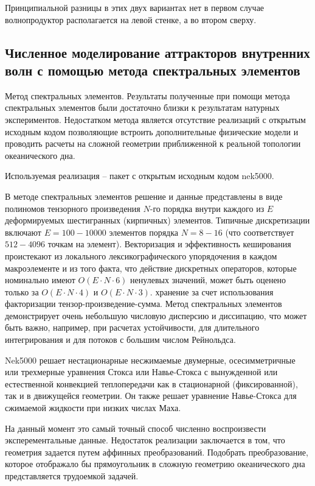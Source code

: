 Принципиальной разницы в этих двух вариантах нет в первом случае волнопродуктор располагается на левой стенке, а во втором сверху.

\subsection{Численное моделирование аттракторов внутренних волн с помощью метода спектральных элементов}

Метод спектральных элементов\cite{Patera1984}. Результаты полученные при помощи метода спектральных элементов были достаточно близки к результатам натурных экспериментов\cite{Brouzet2016,Brouzet_2016}. Недостатком метода является отсутствие реализаций с открытым исходным кодом позволяющие встроить дополнительные физические модели и проводить расчеты на сложной геометрии приближенной к реальной топологии океанического дна.

Используемая реализация -- пакет с открытым исходным кодом nek5000\cite{NEK5000}. 

В методе спектральных элементов решение и данные представлены в виде полиномов тензорного произведения $N$-го порядка внутри каждого из $E$ деформируемых шестигранных (кирпичных) элементов. Типичные дискретизации включают $E = 100 - 10 000$ элементов порядка $N = 8 - 16$ (что соответствует $512 - 4096$ точкам на элемент). Векторизация и эффективность кеширования проистекают из локального лексикографического упорядочения в каждом макроэлементе и из того факта, что действие дискретных операторов, которые номинально имеют $O(E\cdot N \cdot 6)$ ненулевых значений, может быть оценено только за $O(E\cdot N \cdot 4)$ и $O(E\cdot N\cdot 3)$. хранение за счет использования факторизации тензор-произведение-сумма. Метод спектральных элементов демонстрирует очень небольшую числовую дисперсию и диссипацию, что может быть важно, например, при расчетах устойчивости, для длительного интегрирования и для потоков с большим числом Рейнольдса.

Nek5000 решает нестационарные несжимаемые двумерные, осесимметричные или трехмерные уравнения Стокса или Навье-Стокса с вынужденной или естественной конвекцией теплопередачи как в стационарной (фиксированной), так и в движущейся геометрии. Он также решает уравнение Навье-Стокса для сжимаемой жидкости при низких числах Маха.

На данный момент это самый точный способ численно воспроизвести эксперементальные данные\cite{Brouzet2016,Brouzet_2016}. Недостаток реализации заключается в том, что геометрия задается путем аффинных преобразований. Подобрать преобразование, которое отображало бы прямоугольник в сложную геометрию океанического дна представляется трудоемкой задачей. 

